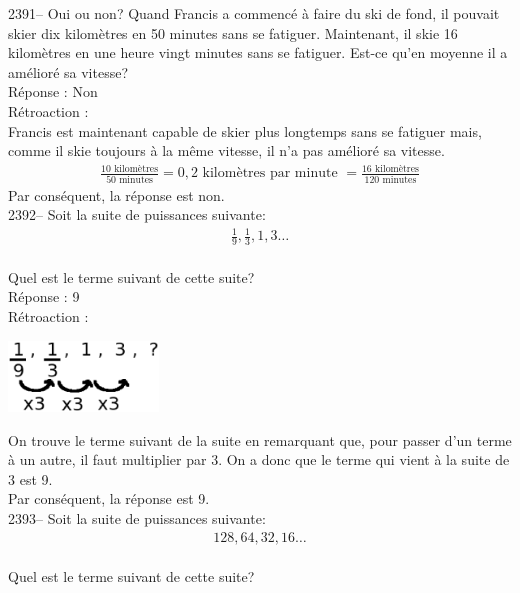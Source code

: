 \documentclass[letterpaper, 12pt]{article}
\begin{document}
2391-- Oui ou non? Quand Francis a commenc\'e \`a faire du ski de fond, il pouvait skier dix kilom\`etres en 50 minutes sans se fatiguer. Maintenant, il skie 16 kilom\`etres en une heure vingt minutes sans se fatiguer. Est-ce qu'en moyenne il a am\'elior\'e sa vitesse?\\

R\'eponse : Non\\

R\'etroaction :\\
Francis est maintenant capable de skier plus longtemps sans se fatiguer mais, comme il skie toujours \`a la m\^eme vitesse, il n'a pas am\'elior\'e sa vitesse.
\begin{eqnarray*}
 \frac{10 \textrm{ kilom\`etres}}{50 \textrm{ minutes}}= 0,2 \textrm{ kilom\`etres par minute }=  \frac{16 \textrm{ kilom\`etres}}{120 \textrm{ minutes}}
\end{eqnarray*}
Par cons\'equent, la r\'eponse est non.\\


2392-- Soit la suite de puissances suivante:\\
\begin{eqnarray*}
\frac{1}{9}, \frac{1}{3}, 1, 3 \ldots
\end{eqnarray*}\\
Quel est le terme suivant de cette suite?\\

R\'eponse : 9\\

R\'etroaction :\\
\begin{center}
 \includegraphics[width=4cm,bb=14 14 308 162]{Q2392.eps}
\end{center}
On trouve le terme suivant de la suite en remarquant que, pour passer d'un terme \`a un autre, il faut multiplier par 3. On a donc que le terme qui vient \`a la suite de 3 est 9.\\
Par cons\'equent, la r\'eponse est 9.\\

2393-- Soit la suite de puissances suivante:\\
\begin{eqnarray*}
128, 64, 32, 16 \ldots
\end{eqnarray*}\\
Quel est le terme suivant de cette suite?\\
\end{document}
